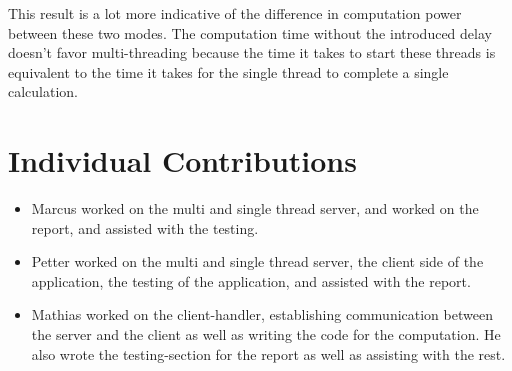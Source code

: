 \documentclass{article}
\begin{document}
This result is a lot more indicative of the difference in computation power between these two modes. The computation time without the introduced delay doesn't favor multi-threading because the time it takes to start these threads is equivalent to the time it takes for the single thread to complete a single calculation.

\section{\textbf{Individual Contributions}}

\begin{itemize}
    \item Marcus worked on the multi and single thread server, and worked on the report, and assisted with the testing.
    \item Petter worked on the multi and single thread server, the client side of the application, the testing of the application, and assisted with the report.
    \item Mathias worked on the client-handler, establishing communication between the server and the client as well as writing the code for the computation. He also wrote the testing-section for the report as well as assisting with the rest.
\end{itemize}
\end{document}
